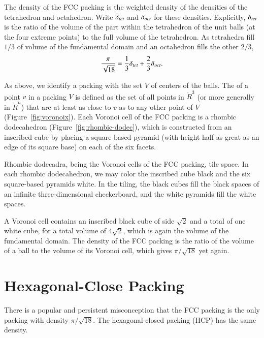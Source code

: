 \figSEYIMIE %

\figAZGXQWC %

The density of the FCC packing is the weighted density
of the densities of the tetrahedron and octahedron.  Write $\delta_{tet}$ and
$\delta_{oct}$ for these densities.  Explicitly, $\delta_{tet}$ is the ratio of the
volume of the part within the tetrahedron of the unit balls (at the
four extreme points) to the full volume of the tetrahedron.  As tetrahedra fill
$1/3$ of volume of the fundamental domain and an octahedron fills
the other $2/3$,
\[ 
  \frac{\pi}{\sqrt{18}} = \frac{1}{3}\delta_{tet} + \frac{2}{3}\delta_{oct}.
\] 

As above, we identify a packing with the set $V$ of centers of the
balls.  The  of a point $v$ in a packing $V$ is
defined as the set of all points in $\ring{R}^3$ (or more generally in
$\ring{R}^n$) that are at least as close to $v$ as to any other point
of $V$ (Figure~\ref{fig:voronoix}).  Each Voronoi cell of the FCC
packing is a rhombic dodecahedron
(Figure~\ref{fig:rhombic-dodec}),
which is constructed from an inscribed cube by placing a square based pyramid
(with height half as great as an edge of its square base) on each of
the six facets.

\figEVIAIQPx %

\figPQJIJGE %

Rhombic dodecadra, being the Voronoi cells of the FCC packing, tile space.
In each rhombic dodecahedron, we 
may color the inscribed cube black and the six square-based pyramids
white.  In the tiling, 
the black cubes fill the black spaces of an infinite three-dimensional
checkerboard, and the white pyramids fill the white spaces.

A Voronoi cell contains an inscribed black cube of side $\sqrt2$ and a total
of one white cube, for a total volume of $4\sqrt2$, which is
again the volume of the fundamental domain.  The density of the
FCC packing is the ratio of the volume of a ball to the volume
of its Voronoi cell, which gives $\pi/\sqrt{18}$ yet again.



\section{Hexagonal-Close Packing}\label{sec:hcp}

There is a popular and persistent misconception that the FCC
 packing is the only packing with density $\pi/\sqrt{18}$.
The hexagonal-closed packing (HCP) has the same density.
%
%
%
%

